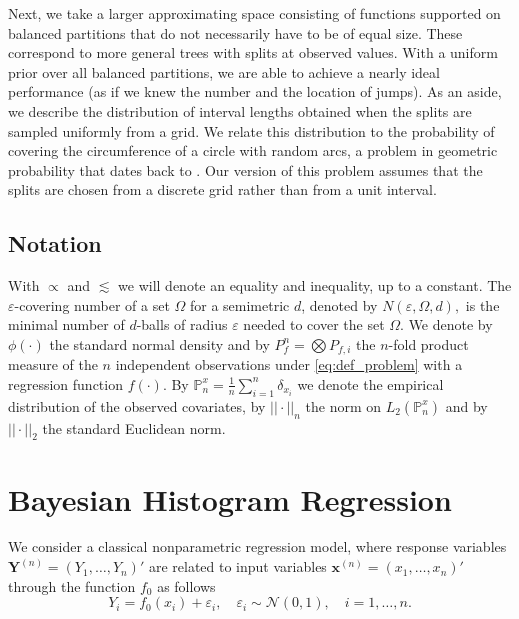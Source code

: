 \documentclass{article}
\newcommand{\1}{\mathbb{I}}
\newcommand{\bm}[1]{\boldsymbol{#1}}
\newcommand{\Y}{\bm{Y}}
\def\Y{\bm{Y}}
\def\x{\bm{x}}
\theoremstyle{assumption}
\begin{document}
Next, we take a  larger approximating space consisting of functions supported on balanced partitions that do not necessarily have to be  of equal size. These correspond to more general trees with splits at observed values. With a uniform prior over all balanced partitions, we are able to achieve a nearly ideal performance (as if we knew the number and the location of jumps). 
As an aside, we describe the distribution of interval lengths obtained when the splits are sampled uniformly from  a grid.
We relate this distribution to the probability of covering the circumference of a circle with random arcs, a problem in geometric probability that dates back to \cite{shepp,Feller68}. Our version of this problem assumes that  the splits are chosen from a discrete grid rather than from  a unit interval.

\vspace{-0.3cm}
\subsection*{Notation}
With $\propto$ and $\lesssim$ {we} will  denote an equality and inequality,  up to a constant.
The $\varepsilon$-covering number of a set $\Omega$ for a semimetric $d$, denoted by $N(\varepsilon,\Omega,d),$ is the minimal number of $d$-balls of radius $\varepsilon$ needed to cover the set $\Omega$. 
We denote by $\phi(\cdot)$ the standard normal density and by  $P_f^n= \bigotimes P_{f,i}$ the $n$-fold product measure of the $n$ independent observations under \eqref{eq:def_problem} with a regression function $f(\cdot)$. By $\mathbb{P}_n^{x}=\frac{1}{n}\sum_{i=1}^n\delta_{x_i}$ we denote the empirical distribution of the observed covariates, by $||\cdot||_n$ the norm on $L_2(\mathbb{P}_n^{x})$ and by $||\cdot||_2$ the standard Euclidean norm.

\vspace{-0.2cm}
\section{Bayesian Histogram Regression}
\vspace{-0.2cm}
We consider a classical nonparametric regression model, where response variables $\Y^{(n)} = (Y_1, \ldots, Y_n)'$ are related to input variables $\x^{(n)} = (x_1, \ldots, x_n)'$ through the function $f_0$ as follows
\vspace{-0.1cm}
\begin{equation}\label{eq:def_problem}
Y_i = f_0(x_i) + \varepsilon_i, \quad \varepsilon_i \sim \mathcal{N}(0, 1), \quad i = 1, \ldots, n.
\end{equation}	
\end{document}
